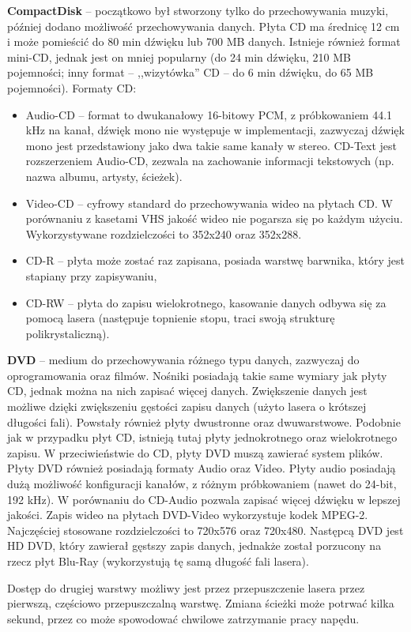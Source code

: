 \textbf{CompactDisk} -- początkowo był stworzony tylko do przechowywania muzyki, później dodano możliwość przechowywania danych. Płyta CD ma średnicę 12 cm i może pomieścić do 80 min dźwięku lub 700 MB danych. Istnieje również format mini-CD, jednak jest on mniej popularny (do 24 min dźwięku, 210 MB pojemności; inny format -- ,,wizytówka'' CD -- do 6 min dźwięku, do 65 MB pojemności). Formaty CD:
\begin{itemize}
\item Audio-CD -- format to dwukanałowy 16-bitowy PCM, z próbkowaniem 44.1 kHz na kanał, dźwięk mono nie występuje w implementacji, zazwyczaj dźwięk mono jest przedstawiony jako dwa takie same kanały w stereo. CD-Text jest rozszerzeniem Audio-CD, zezwala na zachowanie informacji tekstowych (np. nazwa albumu, artysty, ścieżek).
\item Video-CD -- cyfrowy standard do przechowywania wideo na płytach CD. W porównaniu z kasetami VHS jakość wideo nie pogarsza się po każdym użyciu. Wykorzystywane rozdzielczości to 352x240 oraz 352x288.
\item CD-R -- płyta może zostać raz zapisana, posiada warstwę barwnika, który jest stapiany przy zapisywaniu,
\item CD-RW -- płyta do zapisu wielokrotnego, kasowanie danych odbywa się za pomocą lasera (następuje topnienie stopu, traci swoją strukturę polikrystaliczną).
\end{itemize}

\textbf{DVD} -- medium do przechowywania różnego typu danych, zazwyczaj do oprogramowania oraz filmów. Nośniki posiadają takie same wymiary jak płyty CD, jednak można na nich zapisać więcej danych. Zwiększenie danych jest możliwe dzięki zwiększeniu gęstości zapisu danych (użyto lasera o krótszej długości fali). Powstały również płyty dwustronne oraz dwuwarstwowe. Podobnie jak w przypadku płyt CD, istnieją tutaj płyty jednokrotnego oraz wielokrotnego zapisu. W przeciwieństwie do CD, płyty DVD muszą zawierać system plików. Płyty DVD również posiadają formaty Audio oraz Video. Płyty audio posiadają dużą możliwość konfiguracji kanałów, z różnym próbkowaniem (nawet do 24-bit, 192 kHz). W porównaniu do CD-Audio pozwala zapisać więcej dźwięku w lepszej jakości. Zapis wideo na płytach DVD-Video wykorzystuje kodek MPEG-2. Najczęściej stosowane rozdzielczości to 720x576 oraz 720x480. Następcą DVD jest HD DVD, który zawierał gęstszy zapis danych, jednakże został porzucony na rzecz płyt Blu-Ray (wykorzystują tę samą długość fali lasera).

Dostęp do drugiej warstwy możliwy jest przez przepuszczenie lasera przez pierwszą, częściowo przepuszczalną warstwę. Zmiana ścieżki może potrwać kilka sekund, przez co może spowodować chwilowe zatrzymanie pracy napędu.

